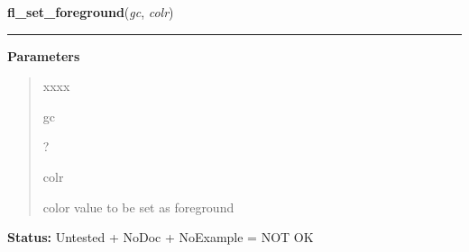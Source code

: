     \label{xformslib:library:fl_set_foreground}

    \vspace{0.5ex}

\hspace{.8\funcindent}\begin{boxedminipage}{\funcwidth}

    \raggedright \textbf{fl\_set\_foreground}(\textit{gc}, \textit{colr})

    \vspace{-1.5ex}

    \rule{\textwidth}{0.5\fboxrule}
\setlength{\parskip}{2ex}
\setlength{\parskip}{1ex}
      \textbf{Parameters}
      \vspace{-1ex}

      \begin{quote}
        \begin{Ventry}{xxxx}

          \item[gc]

          ?

          \item[colr]

          color value to be set as foreground

        \end{Ventry}

      \end{quote}

\textbf{Status:} Untested + NoDoc + NoExample = NOT OK



    \end{boxedminipage}

    \label{xformslib:library:fl_set_background}

    \vspace{0.5ex}

